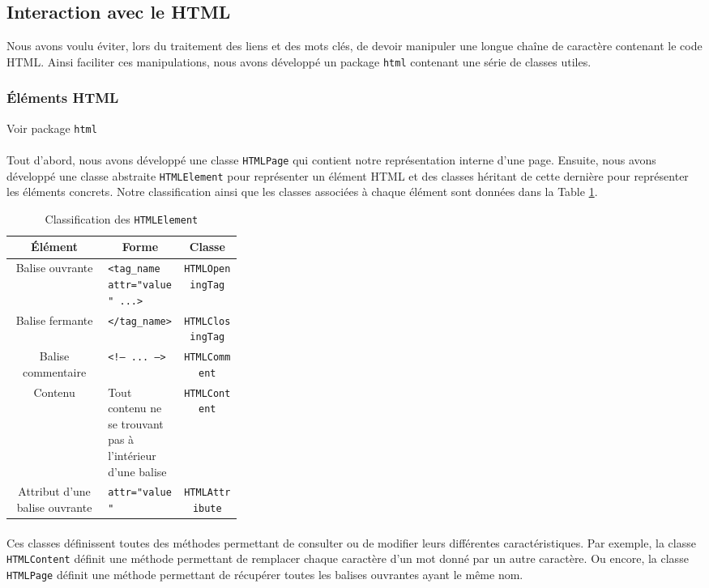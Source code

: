 \documentclass[a4paper,11pt]{article}
\newcommand{\ttseek}[1]{Voir package \texttt{#1}\paragraph{}}
\begin{document}
\subsection{Interaction avec le HTML}
Nous avons voulu éviter, lors du traitement des liens et des mots clés, de devoir manipuler une longue chaîne de caractère contenant le code HTML. Ainsi faciliter ces manipulations, nous avons développé un package \texttt{html} contenant une série de classes utiles. 
\subsubsection{Éléments HTML}
\ttseek{html}
Tout d'abord, nous avons développé une classe \texttt{HTMLPage} qui contient notre représentation interne d'une page.
Ensuite, nous avons développé une classe abstraite \texttt{HTMLElement} pour représenter un élément HTML et des classes héritant de cette dernière pour représenter les éléments concrets. Notre classification ainsi que les classes associées à chaque élément sont données dans la Table \ref{tab:htmlelement}.
\begin{table}[h]
	\center
	\begin{tabular}{|c|p{0.33\linewidth}|c|}
		\hline
		\textbf{Élément} & \multicolumn{1}{c|}{\textbf{Forme}} & \textbf{Classe}\\
		\hline
		Balise ouvrante & \texttt{<tag\_name attr="value" ...>} & \texttt{HTMLOpeningTag}\\
		\hline
		Balise fermante & \texttt{</tag\_name>} & \texttt{HTMLClosingTag}\\
		\hline
		Balise commentaire & \texttt{<!-- ... -->} & \texttt{HTMLComment} \\
		\hline
		Contenu & Tout contenu ne se trouvant pas à l'intérieur d'une balise & \texttt{HTMLContent}\\
		\hline
		Attribut d'une balise ouvrante & \texttt{attr="value"} & \texttt{HTMLAttribute}\\
		\hline
	\end{tabular}
	\caption{Classification des \texttt{HTMLElement}}
	\label{tab:htmlelement}
\end{table}
\paragraph{} Ces classes définissent toutes des méthodes permettant de consulter ou de modifier leurs différentes caractéristiques. Par exemple, la classe \texttt{HTMLContent} définit une méthode permettant de remplacer chaque caractère d'un mot donné par un autre caractère. Ou encore, la classe \texttt{HTMLPage} définit une méthode permettant de récupérer toutes les balises ouvrantes ayant le même nom.
\end{document}
